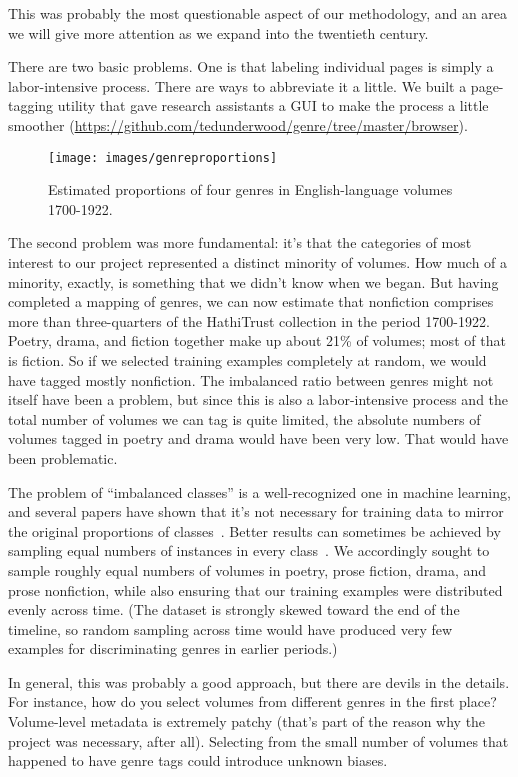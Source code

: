 \documentclass[paper=a4, fontsize=12pt]{scrartcl}
\numberwithin{equation}{section}		%
\numberwithin{figure}{section}			%
\numberwithin{table}{section}				%
\begin{document}
This was probably the most questionable aspect of our methodology, and an area we will give more attention as we expand into the twentieth century.

There are two basic problems. One is that labeling individual pages is simply a labor-intensive process. There are ways to abbreviate it a little. We built a page-tagging utility that gave research assistants a GUI to make the process a little smoother (\url{https://github.com/tedunderwood/genre/tree/master/browser}).

\begin{figure}[!h]
\centering
\texttt{[image: images/genreproportions]}
\caption{Estimated proportions of four genres in English-language volumes 1700-1922.}
\label{genreproportions}
\end{figure}

The second problem was more fundamental: it's that the categories of most interest to our project represented a distinct minority of volumes. How much of a minority, exactly, is something that we didn't know when we began. But having completed a mapping of genres, we can now estimate that nonfiction comprises more than three-quarters of the HathiTrust collection in the period 1700-1922. Poetry, drama, and fiction together make up about 21\% of volumes; most of that is fiction. So if we selected training examples completely at random, we would have tagged mostly nonfiction. The imbalanced ratio between genres might not itself have been a problem, but since this is also a labor-intensive process and the total number of volumes we can tag is quite limited, the absolute numbers of volumes tagged in poetry and drama would have been very low. That would have been problematic.

The problem of ``imbalanced classes'' is a well-recognized one in machine learning, and several papers have shown that it's not necessary for training data to mirror the original proportions of classes~\cite{japkowicz:imbalance}. Better results can sometimes be achieved by sampling equal numbers of instances in every class~\cite{weiss:imbalance}. We accordingly sought to sample roughly equal numbers of volumes in poetry, prose fiction, drama, and prose nonfiction, while also ensuring that our training examples were distributed evenly across time. (The dataset is strongly skewed toward the end of the timeline, so random sampling across time would have produced very few examples for discriminating genres in earlier periods.)

In general, this was probably a good approach, but there are devils in the details. For instance, how do you select volumes from different genres in the first place? Volume-level metadata is extremely patchy (that's part of the reason why the project was necessary, after all). Selecting from the small number of volumes that happened to have genre tags could introduce unknown biases.
\end{document}
